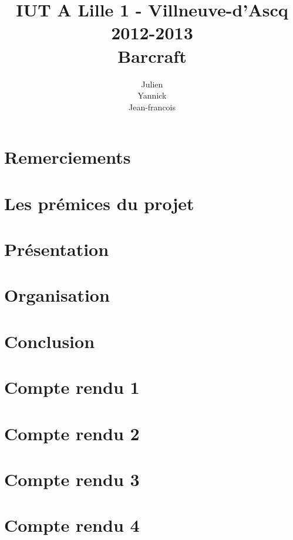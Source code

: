 \documentclass[11pt,a4paper]{report}
\title
{
	\normalsize{IUT A Lille 1 - Villneuve-d'Ascq\\
	2012-2013}\\
	\vspace{15mm}
  \Huge{Barcraft
    \vspace{15mm}}
}
\author{
\bsc{Stechele} Julien\\
\bsc{Vanuxem} Yannick\\
\bsc{Serir} Jean-francois\\
	\vspace{30mm}
}
\begin{document}

\maketitle
\tableofcontents
\newpage

\chapter{Remerciements}%
\label{cha:remerciements}



\chapter{Les prémices du projet}%
\label{cha:les_pr_mices_du_projet}



\chapter{Présentation}%
\label{cha:presentation}



\chapter{Organisation}%
\label{cha:organisation}




\chapter{Conclusion}%
\label{cha:conclusion}




\appendix

\chapter{Compte rendu 1}%
\label{cha:compte_rendu_1}



\chapter{Compte rendu 2}%
\label{cha:compte_rendu_2}



\chapter{Compte rendu 3}%
\label{cha:compte_rendu_3}



\chapter{Compte rendu 4}%
\label{cha:compte_rendu_4}



\end{document}
